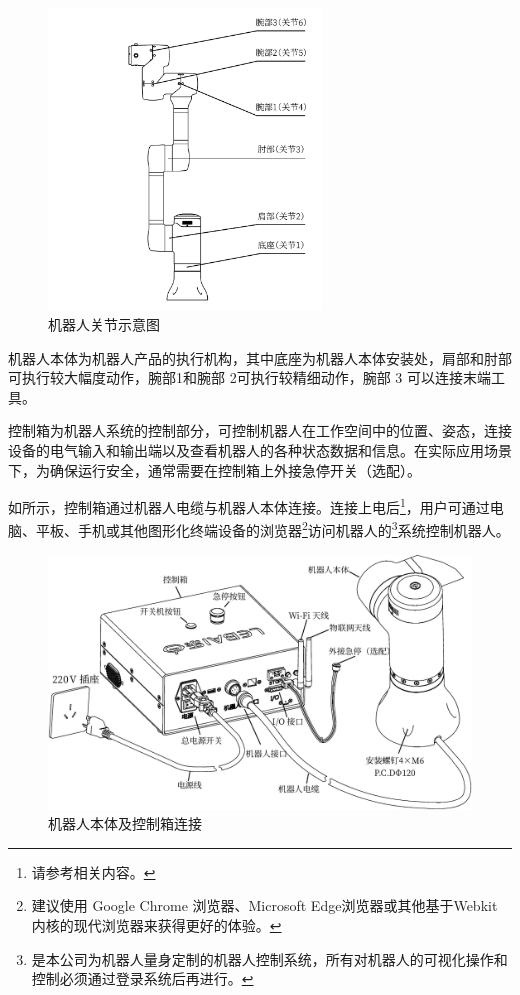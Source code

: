 \begin{figure}[ht]
    \centering
    \includegraphics[height=8cm]{image/arms.pdf}
    \caption{机器人关节示意图}
    \label{fig:机器人关节示意图}
\end{figure}

机器人本体为机器人产品的执行机构，其中底座为机器人本体安装处，肩部和肘部可执行较大幅度动作，腕部1和腕部 2可执行较精细动作，腕部 3 可以连接末端工具。

控制箱为机器人系统的控制部分，可控制机器人在工作空间中的位置、姿态，连接设备的电气输入和输出端以及查看机器人的各种状态数据和信息。在实际应用场景下，为确保运行安全，通常需要在控制箱上外接急停开关（选配）。

\clearpage

如所示，控制箱通过机器人电缆与机器人本体连接。连接上电后\footnote{请参考相关内容。}，用户可通过电脑、平板、手机或其他图形化终端设备的浏览器\footnote{建议使用 Google Chrome 浏览器、Microsoft Edge浏览器或其他基于Webkit 内核的现代浏览器来获得更好的体验。 }访问机器人的\LM\footnote{\LM 是本公司为机器人量身定制的机器人控制系统，所有对机器人的可视化操作和控制必须通过登录\LM 系统后再进行。}系统控制机器人。

\begin{figure}[h!]
    \centering
    \includegraphics[width=\textwidth]{line_graphs/robot_links.pdf}
    \caption{机器人本体及控制箱连接}
    \label{fig:机器人本体及控制箱连接}
\end{figure}


